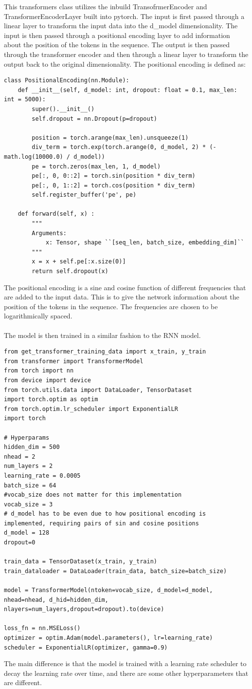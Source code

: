 \documentclass[11pt]{article}
\begin{document}
This transformers class utilizes the inbuild TransofrmerEncoder and TransformerEncoderLayer built into pytorch. The input is first passed through a linear layer to transform the input data into the d\_model dimensionality. The input is then passed through a positional encoding layer to add information about the position of the tokens in the sequence. The output is then passed through the transformer encoder and then through a linear layer to transform the output back to the original dimensionality. The positional encoding is defined as:

\begin{lstlisting}
class PositionalEncoding(nn.Module):
    def __init__(self, d_model: int, dropout: float = 0.1, max_len: int = 5000):
        super().__init__()
        self.dropout = nn.Dropout(p=dropout)

        position = torch.arange(max_len).unsqueeze(1)
        div_term = torch.exp(torch.arange(0, d_model, 2) * (-math.log(10000.0) / d_model))
        pe = torch.zeros(max_len, 1, d_model)
        pe[:, 0, 0::2] = torch.sin(position * div_term)
        pe[:, 0, 1::2] = torch.cos(position * div_term)
        self.register_buffer('pe', pe)

    def forward(self, x) :
        """
        Arguments:
            x: Tensor, shape ``[seq_len, batch_size, embedding_dim]``
        """
        x = x + self.pe[:x.size(0)]
        return self.dropout(x)
\end{lstlisting}

The positional encoding is a sine and cosine function of different frequencies that are added to the input data. This is to give the network information about the position of the tokens in the sequence. The frequencies are chosen to be logarithmically spaced. \\ \\ The model is then trained in a similar fashion to the RNN model.

\begin{lstlisting}
from get_transformer_training_data import x_train, y_train
from transformer import TransformerModel
from torch import nn
from device import device
from torch.utils.data import DataLoader, TensorDataset
import torch.optim as optim
from torch.optim.lr_scheduler import ExponentialLR
import torch

# Hyperparams
hidden_dim = 500
nhead = 2
num_layers = 2
learning_rate = 0.0005
batch_size = 64
#vocab_size does not matter for this implementation
vocab_size = 3
# d_model has to be even due to how positional encoding is implemented, requiring pairs of sin and cosine positions
d_model = 128
dropout=0

train_data = TensorDataset(x_train, y_train)
train_dataloader = DataLoader(train_data, batch_size=batch_size)

model = TransformerModel(ntoken=vocab_size, d_model=d_model, nhead=nhead, d_hid=hidden_dim, nlayers=num_layers,dropout=dropout).to(device)

loss_fn = nn.MSELoss()
optimizer = optim.Adam(model.parameters(), lr=learning_rate)
scheduler = ExponentialLR(optimizer, gamma=0.9)
\end{lstlisting}

The main difference is that the model is trained with a learning rate scheduler to decay the learning rate over time, and there are some other hyperparameters that are different. 
\end{document}
